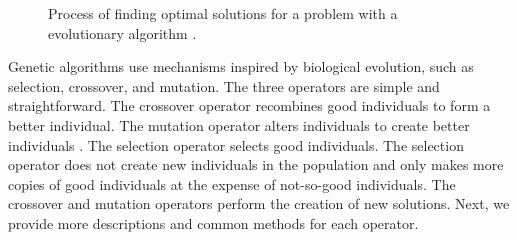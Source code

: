 \begin{figure}[]
        \centering
        \caption{Process of finding optimal solutions for a problem with a 
        evolutionary algorithm \cite{renner_genetic_2003}. }
        \label{fig:genetic_alg}
\end{figure}

Genetic algorithms use mechanisms inspired by biological evolution, such as 
selection, crossover, and mutation. 
The three operators are simple and straightforward.
The crossover operator recombines good individuals to form a better 
individual. 
The mutation operator alters individuals to create better individuals
\cite{deb_multi-objective_2001}.  
The selection operator selects good individuals. 
The selection operator does not create new individuals in the population 
and only makes more copies of good individuals at the expense of not-so-good
individuals. 
The crossover and mutation operators perform the creation of new solutions.
Next, we provide more descriptions and common methods for each operator.

